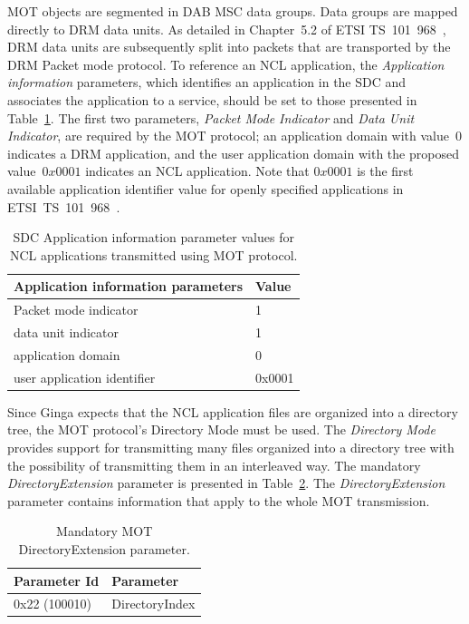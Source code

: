 \documentclass[11pt]{article}
\begin{document}
MOT objects are segmented in DAB MSC data groups. Data groups are mapped
directly to DRM data units.
As detailed in Chapter~5.2 of ETSI TS~101~968~\cite{ETSI-101968-2009},
DRM data units are subsequently split into packets that are transported by
the DRM Packet mode protocol. To reference an NCL
application, the \emph{Application information} parameters, which
identifies an application in the SDC and associates the application to a
service, should be set to those presented in Table~\ref{tablesdc}.
The first two parameters, \emph{Packet Mode Indicator} and \emph{Data Unit
Indicator}, are required by the MOT protocol; an application domain with
value~$0$ indicates a DRM application, and the user application domain with the
proposed value~$0x0001$ indicates an NCL application.
Note that $0x0001$ is the first available application identifier value for
openly specified applications in ETSI~TS~101~968~\cite{ETSI-101968-2009}.

\begin{table}[H]
\centering
\caption{SDC Application information parameter values for NCL applications
  transmitted using MOT protocol.}
\label{tablesdc}
\begin{tabular}{|l|l|}
  \hline
  Application information parameters & Value \\
  \hline
  Packet mode indicator & 1 \\
  \hline
  data unit indicator & 1 \\
  \hline
  application domain & 0 \\
  \hline
  user application identifier & 0x0001 \\
  \hline
\end{tabular}
\end{table}

Since Ginga expects that the NCL application files are organized into a directory
tree, the MOT protocol's Directory Mode must be used. The
\emph{Directory Mode} provides support for transmitting many files organized
into a directory tree with the possibility of transmitting them in an
interleaved way. The mandatory \emph{DirectoryExtension} parameter is presented
in Table~\ref{dirext}.
The \emph{DirectoryExtension} parameter contains information that apply to the
whole MOT transmission.

\begin{table}[H]
\centering
\caption{Mandatory MOT DirectoryExtension parameter.}
\label{dirext}
\begin{tabular}{|l|l|}
  \hline
  Parameter Id & Parameter \\
  \hline
  0x22 (100010) & DirectoryIndex \\
  \hline
\end{tabular}
\end{table}
\end{document}
